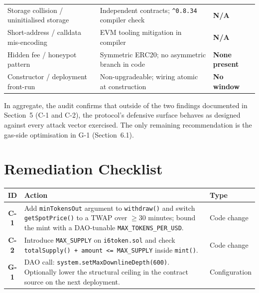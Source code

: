\documentclass[11pt,a4paper]{article}
\begin{document}
\begin{center}
\begin{tabular}{p{5.6cm} p{5.4cm} p{3.5cm}}
Storage collision / uninitialised storage
    & Independent contracts; \texttt{\^{}0.8.34} compiler check
    & \textcolor{passgreen}{\textbf{N/A}} \\
Short-address / calldata mis-encoding
    & EVM tooling mitigation in compiler
    & \textcolor{passgreen}{\textbf{N/A}} \\
Hidden fee / honeypot pattern
    & Symmetric ERC20; no asymmetric branch in code
    & \textcolor{passgreen}{\textbf{None present}} \\
Constructor / deployment front-run
    & Non-upgradeable; wiring atomic at construction
    & \textcolor{passgreen}{\textbf{No window}} \\
\bottomrule
\end{tabular}
\end{center}

In aggregate, the audit confirms that outside of the two findings
documented in Section~5 (C-1 and C-2), the protocol's defensive surface
behaves as designed against every attack vector exercised. The only
remaining recommendation is the gas-side optimisation in G-1
(Section~6.1).

\newpage

\section{Remediation Checklist}

\begin{center}
\renewcommand{\arraystretch}{1.45}
\begin{tabular}{>{\bfseries}c p{8.8cm} >{\centering\arraybackslash}p{3cm}}
\toprule
\textbf{ID} & \textbf{Action} & \textbf{Type} \\
\midrule
C-1 & Add \texttt{minTokensOut} argument to \texttt{withdraw()} and
       switch \texttt{getSpotPrice()} to a TWAP over $\geq 30$ minutes;
       bound the mint with a DAO-tunable \texttt{MAX\_TOKENS\_PER\_USD}.
    & Code change \\
\midrule
C-2 & Introduce \texttt{MAX\_SUPPLY} on \texttt{i6token.sol} and check
       \texttt{totalSupply() + amount <= MAX\_SUPPLY} inside
       \texttt{mint()}.
    & Code change \\
\midrule
G-1 & DAO call: \texttt{system.setMaxDownlineDepth(600)}. Optionally
       lower the structural ceiling in the contract source on the next
       deployment.
    & Configuration \\
\bottomrule
\end{tabular}
\end{center}
\end{document}
